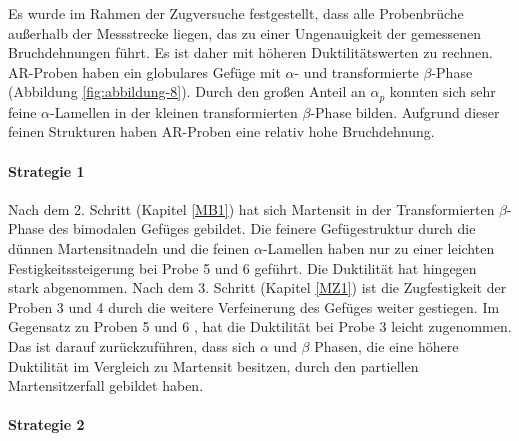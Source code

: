 Es wurde im Rahmen der Zugversuche festgestellt, dass alle Probenbrüche außerhalb der Messstrecke liegen, das zu einer Ungenauigkeit der gemessenen Bruchdehnungen führt. Es ist daher mit höheren Duktilitätswerten zu rechnen. \\

AR-Proben haben ein globulares Gefüge mit $\alpha$- und transformierte $\beta$-Phase (Abbildung \ref{fig:abbildung-8}). Durch den großen Anteil an $\alpha_p$ konnten sich sehr feine $\alpha$-Lamellen in der kleinen transformierten $\beta$-Phase bilden. Aufgrund dieser feinen Strukturen haben AR-Proben eine relativ hohe Bruchdehnung.

\paragraph{Strategie 1}
Nach dem 2. Schritt (Kapitel \ref{MB1}) hat sich Martensit in der Transformierten $\beta$-Phase des bimodalen Gefüges gebildet. Die feinere Gefügestruktur  durch die dünnen Martensitnadeln und die feinen $\alpha$-Lamellen  haben nur zu einer leichten Festigkeitssteigerung bei Probe 5 und 6 geführt. Die Duktilität hat hingegen stark  abgenommen.
Nach dem 3. Schritt (Kapitel \ref{MZ1}) ist die Zugfestigkeit der Proben 3 und 4 durch die weitere Verfeinerung des Gefüges weiter gestiegen. Im Gegensatz zu Proben 5 und 6 , hat die Duktilität bei Probe 3 leicht zugenommen. Das ist  darauf zurückzuführen, dass sich  $\alpha$ und  $\beta$ Phasen, die eine höhere Duktilität im Vergleich zu Martensit besitzen, durch den partiellen Martensitzerfall gebildet haben.


\paragraph{Strategie 2}

